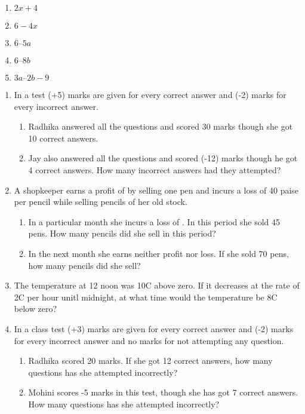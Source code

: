 \begin{enumerate}[label=\thesection.\arabic*, ref=\thesection.\theenumi,resume*]
\item $ 2x +4 $
\item $6 - 4x$
\item $6 – 5a $
\item $6 – 8b $
\item $3a – 2b-9 $
\end{enumerate}
\begin{enumerate}[label=\thesection.\arabic*, ref=\thesection.\theenumi,resume*]
	\item In a test (+5) marks are given for every correct answer and (-2) marks for every incorrect answer.  
		\begin{enumerate}
			\item Radhika answered all the questions and scored 30 marks though she got 10 correct answers.
			\item Jay also answered all the questions and scored (-12) marks though he got 4 correct answers.  How many incorrect answers had they  attempted?
		\end{enumerate}
	\item A shopkeeper earns a profit of  by selling one pen and incurs a loss of 40 paise per pencil while selling pencils of her old stock.  
		\begin{enumerate}
			\item In a particular month she incurs a loss of .  In this period she sold 45 pens.  How many pencils did she sell in this period?
			\item In the next month she earns neither profit nor loss.  If she sold 70 pens, how many pencils did she sell?
		\end{enumerate}
			\item The temperature at 12 noon was 10\degree C above zero. If it decreases at the rate of 2\degree C per hour unitl midnight, at what time would the temperature be 8\degree C below zero? 
	\item In a class test (+3) marks are given for every correct answer and (-2) marks for every incorrect answer and no marks for not attempting any question.   
		\begin{enumerate}
			\item Radhika scored 20 marks.  If she got 12 correct answers, how many questions has she attempted incorrectly?
			\item Mohini scores -5 marks in this test, though she has got 7 correct answers.   How many questions has she attempted incorrectly?

\end{enumerate}
\end{enumerate}
